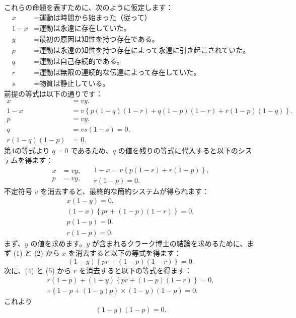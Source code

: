 \documentclass[a4paper,11pt,openany]{ltjsbook}
\begin{document}
これらの命題を表すために、次のように仮定します：
\[
\begin{aligned}
x &= \text{運動は時間から始まった（従って）}\\
1-x &= \text{運動は永遠に存在していた。}\\
y &= \text{最初の原因は知性を持つ存在である。}\\
p &= \text{運動は永遠の知性を持つ存在によって永遠に引き起こされていた。}\\
q &= \text{運動は自己存続的である。}\\
r &= \text{運動は無限の連続的な伝達によって存在していた。}\\
s &= \text{物質は静止している。}
\end{aligned}
\]
前提の等式は以下の通りです：
\[
\begin{aligned}
x &= vy.\\
1-x &= v \left\{p(1-q)(1-r) + q(1-p)(1-r) + r(1-p)(1-q)\right\}.\\
p &= vy.\\
q &= vs(1-s) = 0.\\
r(1-q)(1-p) &= 0.
\end{aligned}
\]
第4の等式より $q = 0$ であるため、$q$ の値を残りの等式に代入すると以下のシステムを得ます：
\[
\begin{aligned}
x &= vy,\\
p &= vy,
\end{aligned}
\quad
\begin{gathered}
1-x = v \left\{p(1-r) + r(1-p)\right\}, \\
r(1-p) = 0.
\end{gathered}
\]
不定符号 $v$ を消去すると、最終的な簡約システムが得られます：
\begin{eqnarray}
x(1-y)=0,\\
(1-x)\left\{pr + (1-p)(1-r)\right\}=0,\\
p(1-y)=0.\\
r(1-p)=0.
\end{eqnarray}
まず、$y$ の値を求めます。$y$ が含まれるクラーク博士の結論を求めるために、まず (1) と (2) から $x$ を消去すると以下の等式を得ます：
\[
(1-y)\left\{pr + (1-p)(1-r)\right\} = 0.
\]
次に、(4) と (5) から $r$ を消去すると以下の等式を得ます：
\[
\begin{gathered}
r(1-p) + (1-y)\left\{pr + (1-p)(1-r)\right\} = 0, \\
\therefore \left\{1 - p + (1-y)p\right\} \times (1-y)(1-p) = 0;
\end{gathered}
\]
これより
\[
(1-y)(1-p) = 0.
\]
\end{document}
